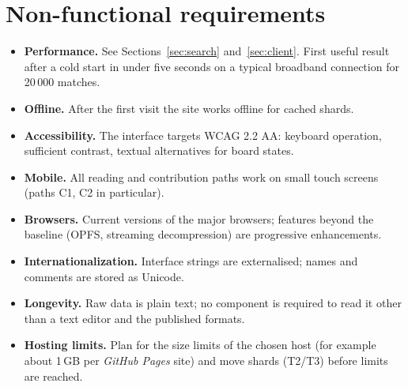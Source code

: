\documentclass[11pt,a4paper]{article}
\newcommand{\kw}[1]{\textit{#1}\index{#1}}
\begin{document}
\section{Non-functional requirements}\label{sec:nfr}
\begin{itemize}
  \item \textbf{Performance.} See Sections~\ref{sec:search} and~\ref{sec:client}. First useful result after a cold start in under five seconds on a typical broadband connection for 20\,000 matches.
  \item \textbf{Offline.} After the first visit the site works offline for cached shards.
  \item \textbf{Accessibility.} The interface targets WCAG 2.2 AA: keyboard operation, sufficient contrast, textual alternatives for board states.
  \item \textbf{Mobile.} All reading and contribution paths work on small touch screens (paths C1, C2 in particular).
  \item \textbf{Browsers.} Current versions of the major browsers; features beyond the baseline (OPFS, streaming decompression) are progressive enhancements.
  \item \textbf{Internationalization.} Interface strings are externalised; names and comments are stored as Unicode.
  \item \textbf{Longevity.} Raw data is plain text; no component is required to read it other than a text editor and the published formats.
  \item \textbf{Hosting limits.} Plan for the size limits of the chosen host (for example about 1\,GB per \kw{GitHub Pages} site) and move shards (T2/T3) before limits are reached.
\end{itemize}

\end{document}
